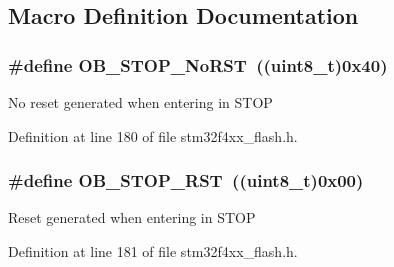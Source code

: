 \subsection{Macro Definition Documentation}
\hypertarget{group___f_l_a_s_h___option___bytes__n_r_s_t___s_t_o_p_ga6762d6e4045fec58b49dfc03c1927d51}{
\subsubsection[{O\-B\-\_\-\-S\-T\-O\-P\-\_\-\-No\-R\-S\-T}]{\setlength{\rightskip}{0pt plus 5cm}\#define O\-B\-\_\-\-S\-T\-O\-P\-\_\-\-No\-R\-S\-T~((uint8\-\_\-t)0x40)}}\label{group___f_l_a_s_h___option___bytes__n_r_s_t___s_t_o_p_ga6762d6e4045fec58b49dfc03c1927d51}
No reset generated when entering in S\-T\-O\-P 

Definition at line 180 of file stm32f4xx\-\_\-flash.\-h.

\hypertarget{group___f_l_a_s_h___option___bytes__n_r_s_t___s_t_o_p_gaef92c03b1f279c532bfa13d3bb074b57}{
\subsubsection[{O\-B\-\_\-\-S\-T\-O\-P\-\_\-\-R\-S\-T}]{\setlength{\rightskip}{0pt plus 5cm}\#define O\-B\-\_\-\-S\-T\-O\-P\-\_\-\-R\-S\-T~((uint8\-\_\-t)0x00)}}\label{group___f_l_a_s_h___option___bytes__n_r_s_t___s_t_o_p_gaef92c03b1f279c532bfa13d3bb074b57}
Reset generated when entering in S\-T\-O\-P 

Definition at line 181 of file stm32f4xx\-\_\-flash.\-h.

